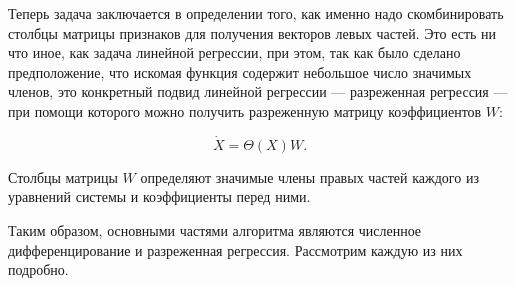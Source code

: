 Теперь задача заключается в определении того, как именно надо скомбинировать столбцы матрицы признаков для получения векторов левых частей. Это есть ни что иное, как задача линейной регрессии, при этом, так как было сделано предположение, что искомая функция содержит небольшое число значимых членов, это конкретный подвид линейной регрессии --- разреженная регрессия --- при помощи которого можно получить разреженную матрицу коэффициентов $W$:

\begin{equation}
\dot{X} = \Theta(X) W.
\end{equation}

Столбцы матрицы $W$ определяют значимые члены правых частей каждого из уравнений системы и коэффициенты перед ними.

Таким образом, основными частями алгоритма являются численное дифференцирование и разреженная регрессия. Рассмотрим каждую из них подробно.

